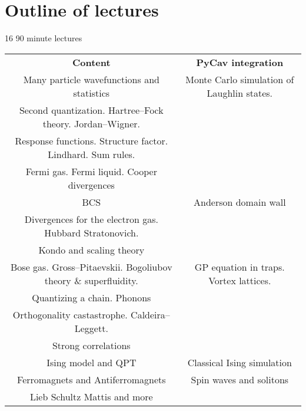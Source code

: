 \section{Outline of lectures}

16 90 minute lectures

\begin{table} 
    \begin{tabular}{ c | c }
     \textbf{Content}   & \textbf{PyCav integration}  \\ 
       Many particle wavefunctions and statistics 
   & Monte Carlo simulation of Laughlin states. \\ 
      Second quantization. Hartree--Fock theory. Jordan--Wigner.  &  \\ 
      Response functions. Structure factor. Lindhard. Sum rules.     &  \\ 
      Fermi gas. Fermi liquid. Cooper divergences   &  \\ 
      BCS   & Anderson domain wall  \\ 
      Divergences for the electron gas. Hubbard Stratonovich. & \\
      Kondo and scaling theory   &  \\ 
      Bose gas. Gross--Pitaevskii. Bogoliubov theory \& superfluidity.   & GP equation in traps. Vortex lattices. \\ 
      Quantizing a chain. Phonons   &  \\ 
      Orthogonality castastrophe. Caldeira--Leggett.   &  \\ 
      Strong correlations   &  \\ 
      Ising model and QPT   &  Classical Ising simulation \\ 
      Ferromagnets and Antiferromagnets   & Spin waves and solitons \\ 
      Lieb Schultz Mattis and more
    \end{tabular} 
\end{table}

